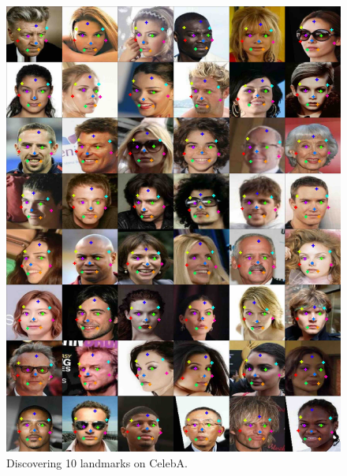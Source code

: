 \begin{figure}[t]
	\centering
	\includegraphics[trim={0cm 0cm 0cm 0cm},clip, width=1.\linewidth]{fig/supp/select48celeba}
	\caption{Discovering 10 landmarks on CelebA.}\label{fig:kp_celeba}%
	\label{fig:kp_celeba}
\end{figure}

